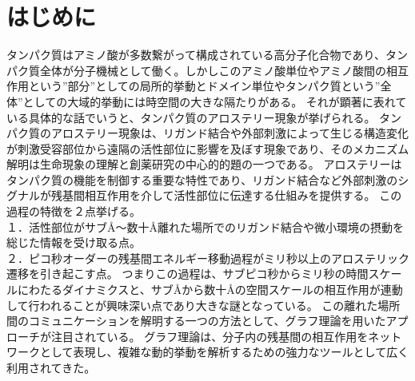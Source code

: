 \section{はじめに}

タンパク質はアミノ酸が多数繋がって構成されている高分子化合物であり、タンパク質全体が分子機械として働く。しかしこのアミノ酸単位やアミノ酸間の相互作用という”部分”としての局所的挙動とドメイン単位やタンパク質という”全体”としての大域的挙動には時空間の大きな隔たりがある。
それが顕著に表れている具体的な話でいうと、タンパク質のアロステリー現象が挙げられる。
タンパク質のアロステリー現象は、リガンド結合や外部刺激によって生じる構造変化が刺激受容部位から遠隔の活性部位に影響を及ぼす現象であり、そのメカニズム解明は生命現象の理解と創薬研究の中心的的題の一つである。
アロステリーはタンパク質の機能を制御する重要な特性であり\cite{Cui2009}、リガンド結合など外部刺激のシグナルが残基間相互作用を介して活性部位に伝達する仕組みを提供する。
この過程の特徴を２点挙げる。\\
１．活性部位がサブÅ～数十Å離れた場所でのリガンド結合や微小環境の摂動を総じた情報を受け取る点。\\
２．ピコ秒オーダーの残基間エネルギー移動過程\cite{Lim1996}がミリ秒以上のアロステリック遷移\cite{Changeux2005}を引き起こす点。
つまりこの過程は、サブピコ秒からミリ秒の時間スケールにわたるダイナミクスと、サブÅから数十Åの空間スケールの相互作用が連動して行われることが興味深い点であり大きな謎\cite{Fenton2008}となっている。
この離れた場所間のコミュニケーションを解明する一つの方法として、グラフ理論を用いたアプローチが注目されている。
グラフ理論は、分子内の残基間の相互作用をネットワークとして表現し、複雑な動的挙動を解析するための強力なツールとして広く利用されてきた\cite{Doncheva2011}\cite{Martin2011}\cite{Doncheva2012}。
